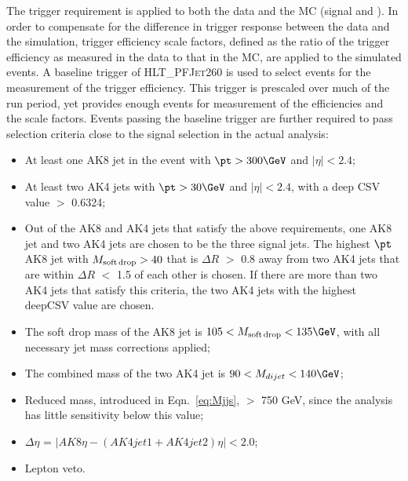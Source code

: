 The trigger requirement is applied to both the data and the MC (signal and \ttbar). In order to compensate for the difference in trigger response between the data and the simulation, trigger efficiency scale factors, defined as the ratio of the trigger efficiency as measured in the data to that in the MC, are applied to the simulated events. A baseline trigger of \textsc{HLT\_PFJet260} is used to select events for the measurement of the trigger efficiency. This trigger is prescaled over much of the run period, yet provides enough events for measurement of the efficiencies and the scale factors. Events passing the baseline trigger are further required to pass selection criteria close to the signal selection in the actual analysis:
\begin{itemize}
 \item At least one AK8 jet in the event with $\pt > 300\GeV$ and $|\eta| < 2.4$;
 \item At least two AK4 jets with $\pt > 30\GeV$ and $|\eta| < 2.4$, with a deep CSV value $>$ 0.6324;
 \item Out of the AK8 and AK4 jets that satisfy the above requirements, one AK8 jet and two AK4 jets are chosen to be the three signal jets. The highest $\pt$ AK8 jet with $M_{\rm soft\,drop} > 40$ \GeV that is $\Delta R$ $>$ 0.8 away from two AK4 jets that are within $\Delta R$ $<$ 1.5 of each other is chosen. If there are more than two AK4 jets that satisfy this criteria, the two AK4 jets with the highest deepCSV value are chosen.
 \item The soft drop mass of the AK8 jet is $105 < M_{\rm soft\,drop} < 135\GeV$, with all necessary jet mass corrections applied;
 \item The combined mass of the two AK4 jet is $90 < M_{dijet} < 140\GeV$;
 \item Reduced mass, introduced in Eqn.~\ref{eq:Mjjs}, $>$ 750 GeV, since the analysis has little sensitivity below this value;
 \item $\Delta\eta$ = $|AK8\eta - (AK4jet1 + AK4jet2)\eta| < 2.0$;
 \item Lepton veto.
\end{itemize}

